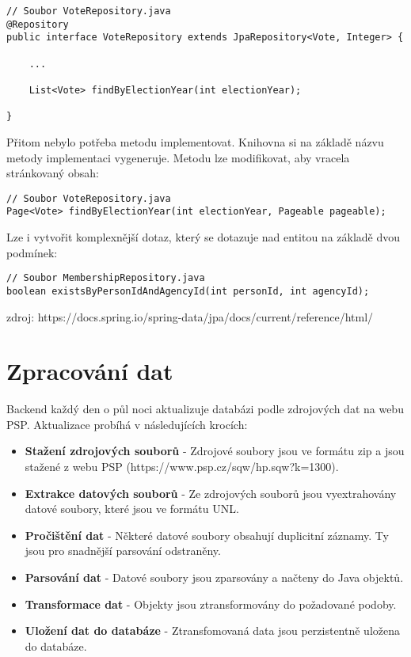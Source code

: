 \begin{lstlisting}[caption={Repozitář pro hlasování}, label={lst:be-repository-vote}, tabsize=2]
// Soubor VoteRepository.java
@Repository
public interface VoteRepository extends JpaRepository<Vote, Integer> {
	
	...
	
	List<Vote> findByElectionYear(int electionYear);
	
}
\end{lstlisting}

\noindent Přitom nebylo potřeba metodu implementovat. Knihovna si na základě názvu metody implementaci vygeneruje. Metodu lze modifikovat, aby vracela stránkovaný obsah:

\begin{lstlisting}[caption={Ukázka query metody pro dotazování se nad stránkovaným obsahem}, label={lst:repository-paging}, tabsize=2]
// Soubor VoteRepository.java
Page<Vote> findByElectionYear(int electionYear, Pageable pageable);
\end{lstlisting}

\noindent Lze i vytvořit komplexnější dotaz, který se dotazuje nad entitou na základě dvou podmínek:

\begin{lstlisting}[caption={Ukázka query metody s dvěma podmínkami}, label={lst:repository-paging}, tabsize=2]
// Soubor MembershipRepository.java
boolean existsByPersonIdAndAgencyId(int personId, int agencyId);
\end{lstlisting}

zdroj: https://docs.spring.io/spring-data/jpa/docs/current/reference/html/


\section{Zpracování dat}
Backend každý den o půl noci aktualizuje databázi podle zdrojových dat na webu PSP. Aktualizace probíhá v následujících krocích:

\begin{itemize}
	\item \textbf{Stažení zdrojových souborů} - Zdrojové soubory jsou ve formátu zip a jsou stažené z webu PSP (https://www.psp.cz/sqw/hp.sqw?k=1300).
	\item \textbf{Extrakce datových souborů} - Ze zdrojových souborů jsou vyextrahovány datové soubory, které jsou ve formátu UNL.
	\item \textbf{Pročištění dat} - Některé datové soubory obsahují duplicitní záznamy. Ty jsou pro snadnější parsování odstraněny.
	\item \textbf{Parsování dat} - Datové soubory jsou zparsovány a načteny do Java objektů.
	\item \textbf{Transformace dat} -  Objekty jsou ztransformovány do požadované podoby.
	\item \textbf{Uložení dat do databáze} - Ztransfomovaná data jsou perzistentně uložena do databáze.
\end{itemize}

